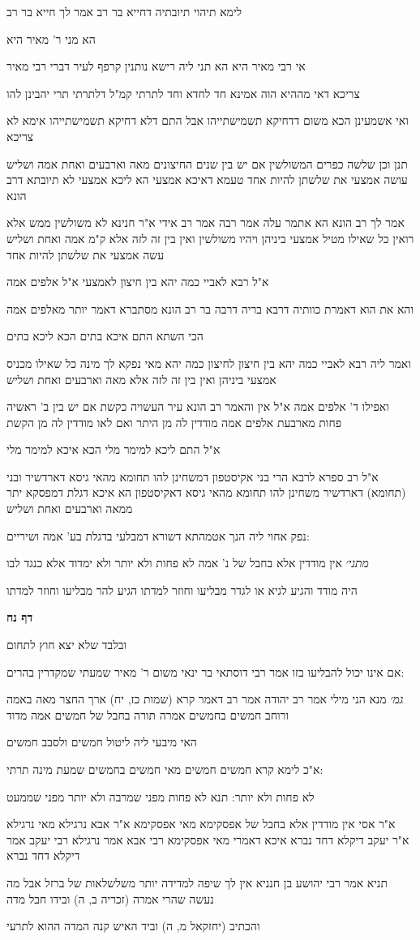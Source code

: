 \documentclass[12pt, openany]{book}
\newcommand{\sethebfont}{
\fontsize{10.5pt}{21.0pt} \selectfont
}
\newcommand{\textblock}[1]{
{\sethebfont #1\\}	
}
\newcommand{\sectname}{}
\newcommand{\newsection}[1]{
	\addcontentsline{toc}{section}{#1}
	\renewcommand{\sectname}{#1}	
	\vspace{-\baselineskip}
	\begin{center}
		\textbf{%
\fontsize{16pt}{16pt}\selectfont
			#1}
	\end{center}
	\vspace{-\baselineskip}
	\nopagebreak
}
\begin{document}
\textblock{לימא תיהוי תיובתיה דחייא בר רב אמר לך חייא בר רב}
\textblock{הא מני ר' מאיר היא}
\textblock{אי רבי מאיר היא הא תני ליה רישא נותנין קרפף לעיר דברי רבי מאיר}
\textblock{צריכא דאי מההיא הוה אמינא חד לחדא וחד לתרתי קמ"ל דלתרתי תרי יהבינן להו}
\textblock{ואי אשמעינן הכא משום דדחיקא תשמישתייהו אבל התם דלא דחיקא תשמישתייהו אימא לא צריכא}
\textblock{תנן וכן שלשה כפרים המשולשין אם יש בין שנים החיצונים מאה וארבעים ואחת אמה ושליש עושה אמצעי את שלשתן להיות אחד טעמא דאיכא אמצעי הא ליכא אמצעי לא תיובתא דרב הונא}
\textblock{אמר לך רב הונא הא אתמר עלה אמר רבה אמר רב אידי א"ר חנינא לא משולשין ממש אלא רואין כל שאילו מטיל אמצעי ביניהן ויהיו משולשין ואין בין זה לזה אלא ק"מ אמה ואחת ושליש עשה אמצעי את שלשתן להיות אחד}
\textblock{א"ל רבא לאביי כמה יהא בין חיצון לאמצעי א"ל אלפים אמה}
\textblock{והא את הוא דאמרת כוותיה דרבא בריה דרבה בר רב הונא מסתברא דאמר יותר מאלפים אמה}
\textblock{הכי השתא התם איכא בתים הכא ליכא בתים}
\textblock{ואמר ליה רבא לאביי כמה יהא בין חיצון לחיצון כמה יהא מאי נפקא לך מינה כל שאילו מכניס אמצעי ביניהן ואין בין זה לזה אלא מאה וארבעים ואחת ושליש}
\textblock{ואפילו ד' אלפים אמה א"ל אין והאמר רב הונא עיר העשויה כקשת אם יש בין ב' ראשיה פחות מארבעת אלפים אמה מודדין לה מן היתר ואם לאו מודדין לה מן הקשת}
\textblock{א"ל התם ליכא למימר מלי הכא איכא למימר מלי}
\textblock{א"ל רב ספרא לרבא הרי בני אקיסטפון דמשחינן להו תחומא מהאי גיסא דארדשיר ובני (תחומא) דארדשיר משחינן להו תחומא מהאי גיסא דאקיסטפון הא איכא דגלת דמפסקא יתר ממאה וארבעים ואחת ושליש}
\textblock{נפק אחוי ליה הנך אטמהתא דשורא דמבלעי בדגלת בע' אמה ושיריים:}
\textblock{{\large\emph{מתני׳}} אין מודדין אלא בחבל של נ' אמה לא פחות ולא יותר ולא ימדוד אלא כנגד לבו}
\textblock{היה מודד והגיע לגיא או לגדר מבליעו וחוזר למדתו הגיע להר מבליעו וחוזר למדתו}
\newsection{דף נח}
\textblock{ובלבד שלא יצא חוץ לתחום}
\textblock{אם אינו יכול להבליעו בזו אמר רבי דוסתאי בר ינאי משום ר' מאיר שמעתי שמקדרין בהרים:}
\textblock{{\large\emph{גמ׳}} מנא הני מילי אמר רב יהודה אמר רב דאמר קרא (שמות כז, יח) ארך החצר מאה באמה ורוחב חמשים בחמשים אמרה תורה בחבל של חמשים אמה מדוד}
\textblock{האי מיבעי ליה ליטול חמשים ולסבב חמשים}
\textblock{א"כ לימא קרא חמשים חמשים מאי חמשים בחמשים שמעת מינה תרתי:}
\textblock{לא פחות ולא יותר: תנא לא פחות מפני שמרבה ולא יותר מפני שממעט}
\textblock{א"ר אסי אין מודדין אלא בחבל של אפסקימא מאי אפסקימא א"ר אבא נרגילא מאי נרגילא א"ר יעקב דיקלא דחד נברא איכא דאמרי מאי אפסקימא רבי אבא אמר נרגילא רבי יעקב אמר דיקלא דחד נברא}
\textblock{תניא אמר רבי יהושע בן חנניא אין לך שיפה למדידה יותר משלשלאות של ברזל אבל מה נעשה שהרי אמרה (זכריה ב, ה) ובידו חבל מדה}
\textblock{והכתיב (יחזקאל מ, ה) וביד האיש קנה המדה ההוא לתרעי}
\end{document}
